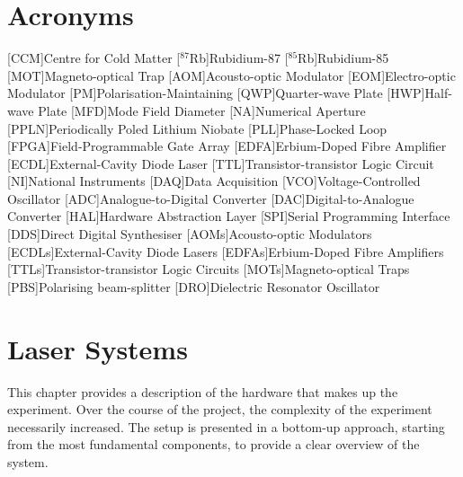\chapter*{Acronyms}
    \begin{acronym}
        [CCM]{Centre for Cold Matter}
        [\(^{87}\)Rb]{Rubidium-87}
        [\(^{85}\)Rb]{Rubidium-85}
        [MOT]{Magneto-optical Trap}
        [AOM]{Acousto-optic Modulator}
        [EOM]{Electro-optic Modulator}
        [PM]{Polarisation-Maintaining}
        [QWP]{Quarter-wave Plate}
        [HWP]{Half-wave Plate}
        [MFD]{Mode Field Diameter}
        [NA]{Numerical Aperture}
        [PPLN]{Periodically Poled Lithium Niobate}
        [PLL]{Phase-Locked Loop}
        [FPGA]{Field-Programmable Gate Array}
        [EDFA]{Erbium-Doped Fibre Amplifier}
        [ECDL]{External-Cavity Diode Laser}
        [TTL]{Transistor-transistor Logic Circuit}
        [NI]{National Instruments}
        [DAQ]{Data Acquisition}
        [VCO]{Voltage-Controlled Oscillator}
        [ADC]{Analogue-to-Digital Converter}
        [DAC]{Digital-to-Analogue Converter}
        [HAL]{Hardware Abstraction Layer}
        [SPI]{Serial Programming Interface}
        [DDS]{Direct Digital Synthesiser}
        [AOMs]{Acousto-optic Modulators}
        [ECDLs]{External-Cavity Diode Lasers}
        [EDFAs]{Erbium-Doped Fibre Amplifiers}
        [TTLs]{Transistor-transistor Logic Circuits}
        [MOTs]{Magneto-optical Traps}
        [PBS]{Polarising beam-splitter}
        [DRO]{Dielectric Resonator Oscillator}
    \end{acronym}


\chapter{Laser Systems}\label{chap:setup}
This chapter provides a description of the hardware that makes up the experiment. Over the course of the project, the complexity of the experiment necessarily increased. The setup is presented in a bottom-up approach, starting from the most fundamental components, to provide a clear overview of the system. \\

